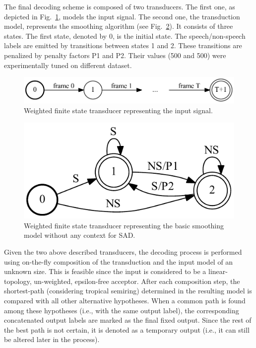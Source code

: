 \documentclass[FM,noheader,EN,bwtitles]{tulthesis}
\begin{document}
The final decoding scheme is composed of two transducers.
The first one, as depicted in Fig.~\ref{fig:t1}, models the input signal.
The second one, the transduction model, represents the smoothing algorithm (see Fig.~\ref{fig:t2}).
It consists of three states. 
The first state, denoted by 0, is the initial state.
The speech/non-speech labels are emitted by transitions between states 1 and 2. 
These transitions are penalized by penalty factors P1 and P2.
Their values (500 and 500) were experimentally tuned on different dataset.

\begin{figure}[ht]
\centering
\includegraphics[scale=0.9]{img/t1.pdf}
\caption{{Weighted finite state transducer representing the input signal.}}
\label{fig:t1}
\end{figure}

\begin{figure}[ht]
\centering
\includegraphics[scale=0.9]{img/t2.pdf}
\caption{{Weighted finite state transducer representing the basic smoothing model without any context for SAD.}}
\label{fig:t2}
\end{figure}

Given the two above described transducers, the decoding process is performed using on-the-fly composition of the transduction and the input model of an unknown size.
This is feasible since the input is considered to be a linear-topology, un-weighted, epsilon-free acceptor.
After each composition step, the shortest-path (considering tropical semiring) determined in the resulting model is compared with all other alternative hypotheses.
When a common path is found among these hypotheses (i.e., with the same output label), the corresponding concatenated output labels are marked as the final fixed output.
Since the rest of the best path is not certain, it is denoted as a temporary output (i.e., it can still be altered later in the process). 
\end{document}
